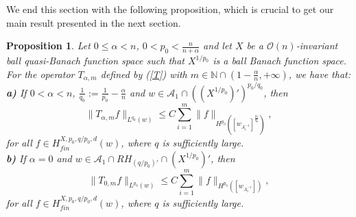 \documentclass[oneside,10pt]{article}
\newtheorem{proposition}[theorem]{Proposition}
\begin{document}
We end this section with the following proposition, which is crucial to get our main result presented in the next section.

\begin{proposition} \label{w ineq T}
Let $0 \leq \alpha < n$, $0 < p_0 < \frac{n}{n+ \alpha}$ and let $X$ be a $\mathcal{O}(n)$-invariant ball quasi-Banach function space 
such that $X^{1/p_0}$ is a ball Banach function space. For the operator $T_{\alpha, m}$ defined by (\ref{T}) with 
$m \in \mathbb{N} \cap \left(1 - \frac{\alpha}{n}, +\infty \right)$, we have that: 
\\
\textbf{a)} If $0 < \alpha < n$, $\frac{1}{q_0} := \frac{1}{p_0} - \frac{\alpha}{n}$ and $w \in \mathcal{A}_1 \cap ((X^{1/p_0})')^{p_0/q_0}$, then
\[
\| T_{\alpha, m} f \|_{L^{q_0}(w)} \leq C \sum_{i=1}^{m} \| f \|_{H^{p_0}\left( [w_{A_i^{-1}}]^{\frac{p_{0}}{q_{0}}} \right)},
\]
for all $f \in H^{X, p_0, q/p_0, d}_{fin}(w)$, where $q$ is sufficiently large.
\\
\textbf{b)} If $\alpha=0$ and $w \in \mathcal{A}_1 \cap RH_{(q/p_0)'} \cap (X^{1/p_0})'$, then
\[
\| T_{0, m} f \|_{L^{p_0}(w)} \leq C \sum_{i=1}^{m} \| f \|_{H^{p_0}\left( [w_{A_i^{-1}}] \right)},
\]
for all $f \in H^{X, p_0, q/p_0, d}_{fin}(w)$, where $q$ is sufficiently large.
\end{proposition}
\end{document}
